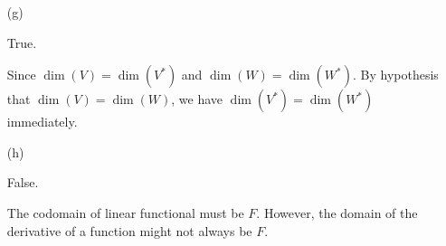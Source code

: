 \begin{Exercise}
\begin{enumerate}[(a)]
\item[(g)]
\begin{answer}
True.
\end{answer}
\begin{solution}
Since $\dim(V)=\dim(V^*)$ and $\dim(W)=\dim(W^*)$. By hypothesis that $\dim(V)=\dim(W)$, we have $\dim(V^*)=\dim(W^*)$ immediately.
\end{solution}

\item[(h)]
\begin{answer}
False.
\end{answer}
\begin{solution}
The codomain of linear functional must be $F$. However, the domain of the derivative of a function might not always be $F$.
\end{solution}

\end{enumerate}
\end{Exercise}